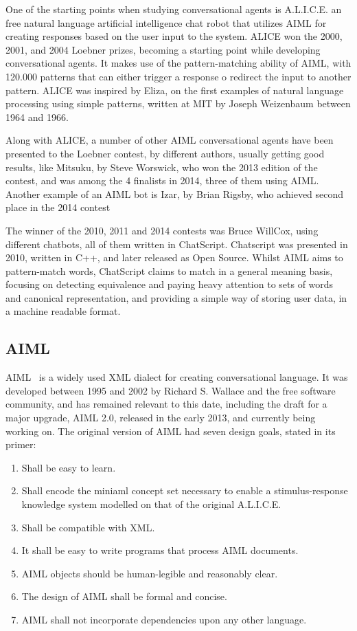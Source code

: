 One of the starting points when studying conversational agents is A.L.I.C.E. an free natural language artificial intelligence chat robot that utilizes AIML for creating responses based on the user input to the system. ALICE won the 2000, 2001, and 2004 Loebner prizes, becoming a starting point while developing conversational agents. It makes use of the pattern-matching ability of AIML, with 120.000 patterns that can either trigger a response o redirect the input to another pattern. ALICE was inspired by Eliza, on the first examples of natural language processing using simple patterns, written at MIT by Joseph Weizenbaum between 1964 and 1966.

Along with ALICE, a number of other AIML conversational agents have been presented to the Loebner contest, by different authors, usually getting good results, like Mitsuku, by Steve Worswick, who won the 2013 edition of the contest, and was among the 4 finalists in 2014, three of them using AIML. Another example of an AIML bot is Izar, by Brian Rigsby, who achieved second place in the 2014 contest

The winner of the 2010, 2011 and 2014 contests was Bruce WillCox, using different chatbots, all of them written in ChatScript. Chatscript was presented in 2010, written in C++, and later released as Open Source. Whilst AIML aims to pattern-match words, ChatScript claims to match in a general meaning basis, focusing on detecting equivalence and paying heavy attention to sets of words and canonical representation, and providing a simple way of storing user data, in a machine readable format.

\subsection{\ac{AIML}}

\ac{AIML}~\cite{aimlprimer} is a widely used XML dialect for creating conversational language. It was developed between 1995 and 2002 by Richard S. Wallace and the free software community, and has remained relevant to this date, including the draft for a major upgrade, AIML 2.0, released in the early 2013, and currently being working on. The original version of AIML had seven design goals, stated in its primer:
\begin{enumerate}%
  \item Shall be easy to learn.
  \item Shall encode the miniaml concept set necessary to enable a stimulus-response knowledge system modelled on that of the original A.L.I.C.E.
  \item Shall be compatible with XML.
  \item It shall be easy to write programs that process AIML documents.
  \item \ac{AIML} objects should be human-legible and reasonably clear.
  \item The design of \ac{AIML} shall be formal and concise.
  \item \ac{AIML} shall not incorporate dependencies upon any other language.
\end{enumerate}

